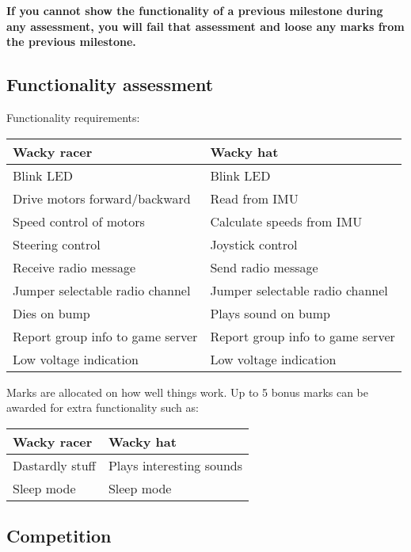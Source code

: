 \documentclass[11pt, a4paper]{article}
\begin{document}
\textbf{If you cannot show the functionality of a previous milestone
  during any assessment, you will fail that assessment and loose any
  marks from the previous milestone.}


\subsection{Functionality assessment}

Functionality requirements:
%
\begin{flushleft}
  \begin{tabular}{l|l}
    Wacky racer & Wacky hat \\ \hline \hline
    Blink LED                      & Blink LED \\
    Drive motors forward/backward  & Read from IMU \\
    Speed control of motors        & Calculate speeds from IMU \\
    Steering control               & Joystick control \\
    Receive radio message          & Send radio message \\
    Jumper selectable radio channel & Jumper selectable radio channel  \\    
    Dies on bump                   & Plays sound on bump \\
    Report group info to game server & Report group info to game server \\
    Low voltage indication         & Low voltage indication \\
  \end{tabular}
\end{flushleft}
%
Marks are allocated on how well things work.  Up to 5 bonus marks can
be awarded for extra functionality such as:
%
\begin{flushleft}
  \begin{tabular}{l|l}
    Wacky racer                & Wacky hat \\ \hline \hline
    Dastardly stuff            & Plays interesting sounds \\
    Sleep mode                 & Sleep mode \\
  \end{tabular}
\end{flushleft}


\subsection{Competition}
\end{document}
